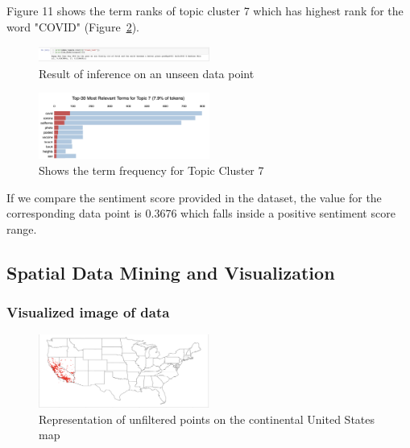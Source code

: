 Figure 11 shows the term ranks of topic cluster 7 which has highest rank for
the word "COVID" (Figure~\ref{fig:Shows the term frequency}).
\begin{figure}[H]
    \centering
    \includegraphics[width=0.5\textwidth]{imgs/infer.png}
    \caption{Result of inference on an unseen data point}
    \label{fig:Result of inference}
\end{figure}
\begin{figure}[H]
    \centering
    \includegraphics[width=0.5\textwidth]{imgs/cluster_7.png}
    \caption{Shows the term frequency for Topic Cluster 7}
    \label{fig:Shows the term frequency}
\end{figure}
If we compare the sentiment score provided in the dataset, the value for the
corresponding data point is 0.3676 which falls inside a positive sentiment
score range.

\subsection{Spatial Data Mining and Visualization}
\subsubsection{Visualized image of data}
\begin{figure}[h]
\centering
\includegraphics[width=0.5\textwidth]{imgs/USA.png}
\caption{\label{fig:Representation of unfiltered points}Representation of unfiltered points on
 the continental United States map}
\end{figure}

